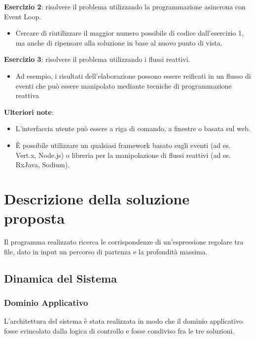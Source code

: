 \documentclass[a4paper]{article}
\begin{document}
\textbf{Esercizio 2}: risolvere il problema utilizzando la programmazione asincrona con Event Loop.

\begin{itemize}
%
    \item Cercare di riutilizzare il maggior numero possibile di codice dall'esercizio 1, ma anche di ripensare alla soluzione in base al nuovo punto di vista.
%
\end{itemize}

\textbf{Esercizio 3}: risolvere il problema utilizzando i flussi reattivi.

\begin{itemize}
%
        \item Ad esempio, i risultati dell'elaborazione possono essere reificati in un flusso di eventi che pu\`o essere manipolato mediante tecniche di programmazione reattiva
%
    \end{itemize}

\textbf{Ulteriori note}:

\begin{itemize}
%
    \item L'interfaccia utente pu\`o essere a riga di comando, a finestre o basata sul web.
%
    \item \`E possibile utilizzare un qualsiasi framework basato sugli eventi (ad es. Vert.x, Node.js) o libreria per la manipolazione di flussi reattivi (ad es. RxJava, Sodium).
%
\end{itemize}

\section{Descrizione della soluzione proposta}\label{descrizione-della-soluzione-proposta}

Il programma realizzato ricerca le corrispondenze di un'espressione regolare tra file, dato in input un percorso di partenza e la profondit\`a massima.

\subsection{Dinamica del Sistema}

\subsubsection{Dominio Applicativo}

L'architettura del sistema \`e stata realizzata in modo che il dominio applicativo fosse svincolato dalla logica di controllo e fosse condiviso fra le tre soluzioni.
\end{document}
